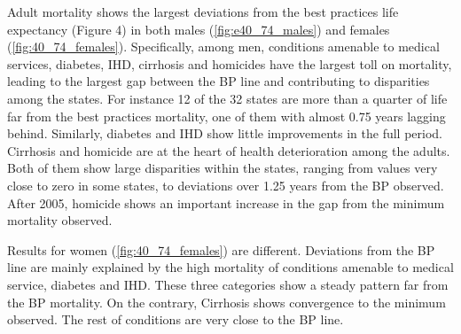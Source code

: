 \documentclass{article}
\begin{document}
Adult mortality shows the largest deviations from the best practices life expectancy (Figure 4) in both males (\ref{fig:e40_74_males}) and females (\ref{fig:40_74_females}). Specifically, among men, conditions amenable to medical services, diabetes, IHD, cirrhosis and homicides have the largest toll on mortality, leading to the largest gap between the BP line and contributing to disparities among the states. For instance 12 of the 32 states are more than a quarter of life far from the best practices mortality, one of them with almost 0.75 years lagging behind. Similarly, diabetes and IHD show little improvements in the full period. Cirrhosis and homicide are at the heart of health deterioration among the adults. Both of them show large disparities within the states, ranging from values very close to zero in some states, to deviations over 1.25 years from the BP observed. After 2005, homicide shows an important increase in the gap from the minimum mortality observed. 

Results for women  (\ref{fig:40_74_females}) are different. Deviations from the BP line are mainly explained by the high mortality of conditions amenable to medical service, diabetes and IHD. These three categories show a steady pattern far from the BP mortality. On the contrary, Cirrhosis shows convergence to the minimum observed. The rest of conditions are very close to the BP line. 
\end{document}

